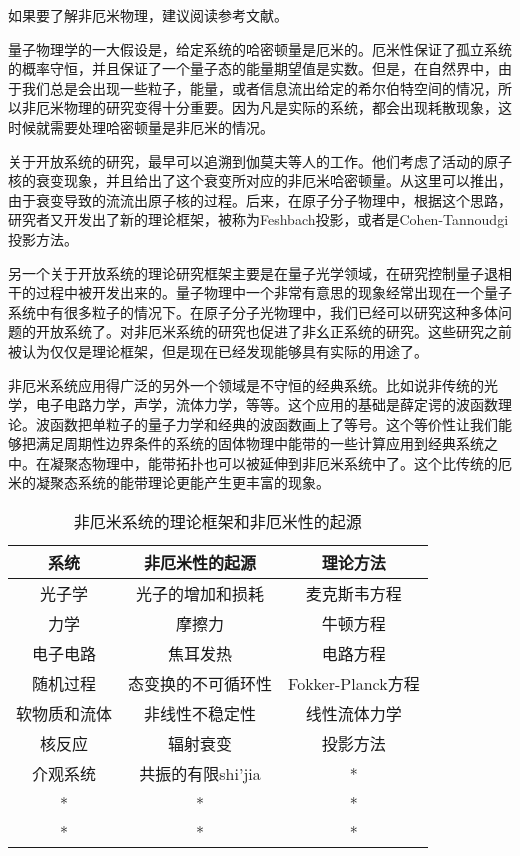 
如果要了解非厄米物理，建议阅读参考文献\cite{Ashida:2020dkc}。

量子物理学的一大假设是，给定系统的哈密顿量是厄米的。厄米性保证了孤立系统的概率守恒，并且保证了一个量子态的能量期望值是实数。但是，在自然界中，由于我们总是会出现一些粒子，能量，或者信息流出给定的希尔伯特空间的情况，所以非厄米物理的研究变得十分重要。因为凡是实际的系统，都会出现耗散现象，这时候就需要处理哈密顿量是非厄米的情况。

关于开放系统的研究，最早可以追溯到伽莫夫等人的工作。他们考虑了活动的原子核的衰变现象，并且给出了这个衰变所对应的非厄米哈密顿量。从这里可以推出，由于衰变导致的流流出原子核的过程。后来，在原子分子物理中，根据这个思路，研究者又开发出了新的理论框架，被称为Feshbach投影，或者是Cohen-Tannoudgi投影方法。

另一个关于开放系统的理论研究框架主要是在量子光学领域，在研究控制量子退相干的过程中被开发出来的。量子物理中一个非常有意思的现象经常出现在一个量子系统中有很多粒子的情况下。在原子分子光物理中，我们已经可以研究这种多体问题的开放系统了。对非厄米系统的研究也促进了非幺正系统的研究。这些研究之前被认为仅仅是理论框架，但是现在已经发现能够具有实际的用途了。

非厄米系统应用得广泛的另外一个领域是不守恒的经典系统。比如说非传统的光学，电子电路力学，声学，流体力学，等等。这个应用的基础是薛定谔的波函数理论。波函数把单粒子的量子力学和经典的波函数画上了等号。这个等价性让我们能够把满足周期性边界条件的系统的固体物理中能带的一些计算应用到经典系统之中。在凝聚态物理中，能带拓扑也可以被延伸到非厄米系统中了。这个比传统的厄米的凝聚态系统的能带理论更能产生更丰富的现象。

\begin{table}[ht]
\centering
\caption{非厄米系统的理论框架和非厄米性的起源}\label{tab_nonHer1}
\begin{tabular}{|c|c|c|}
\hline
系统 & 非厄米性的起源 & 理论方法 \\
\hline
光子学 & 光子的增加和损耗 & 麦克斯韦方程 \\
\hline
力学 & 摩擦力 & 牛顿方程 \\
\hline
电子电路 & 焦耳发热 & 电路方程 \\
\hline
随机过程 & 态变换的不可循环性 & Fokker-Planck方程 \\
\hline
软物质和流体 & 非线性不稳定性 & 线性流体力学 \\
\hline
核反应 & 辐射衰变 & 投影方法 \\
\hline
介观系统 & 共振的有限shi'jia & * \\
\hline
* & * & * \\
\hline
* & * & * \\
\hline
\end{tabular}
\end{table}

